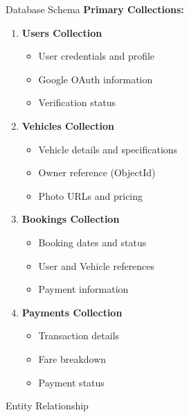\documentclass{beamer}
\begin{document}
\begin{frame}{Database Schema}
\textbf{Primary Collections:}
\begin{enumerate}
    \item \textbf{Users Collection}
    \begin{itemize}
        \item User credentials and profile
        \item Google OAuth information
        \item Verification status
    \end{itemize}
    
    \item \textbf{Vehicles Collection}
    \begin{itemize}
        \item Vehicle details and specifications
        \item Owner reference (ObjectId)
        \item Photo URLs and pricing
    \end{itemize}
    
    \item \textbf{Bookings Collection}
    \begin{itemize}
        \item Booking dates and status
        \item User and Vehicle references
        \item Payment information
    \end{itemize}
    
    \item \textbf{Payments Collection}
    \begin{itemize}
        \item Transaction details
        \item Fare breakdown
        \item Payment status
    \end{itemize}
\end{enumerate}
\end{frame}

\begin{frame}{Entity Relationship}
\begin{center}
\end{center}
\end{frame}
\end{document}
